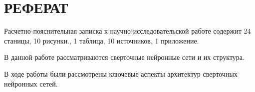 \chapter*{РЕФЕРАТ}

Расчетно-пояснительная записка к научно-исследовательской работе содержит 24 станицы, 10 рисунки., 1 таблица, 10 источников, 1 приложение.

В данной работе рассматриваются сверточные нейронные сети и их структура.

В ходе работы были рассмотрены ключевые аспекты архитектур сверточных нейронных сетей.

\setcounter{page}{3}